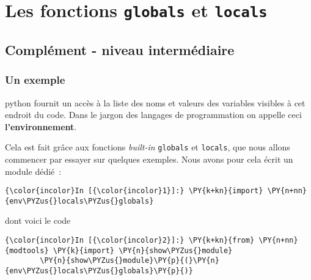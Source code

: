     
    
    
    

    

    \hypertarget{les-fonctions-globals-et-locals}{%
\section{\texorpdfstring{Les fonctions \texttt{globals} et
\texttt{locals}}{Les fonctions globals et locals}}\label{les-fonctions-globals-et-locals}}

    \hypertarget{compluxe9ment---niveau-intermuxe9diaire}{%
\subsection{Complément - niveau
intermédiaire}\label{compluxe9ment---niveau-intermuxe9diaire}}

    \hypertarget{un-exemple}{%
\subsubsection{Un exemple}\label{un-exemple}}

    python fournit un accès à la liste des noms et valeurs des variables
visibles à cet endroit du code. Dans le jargon des langages de
programmation on appelle ceci \textbf{l'environnement}.

Cela est fait grâce aux fonctions \emph{built-in} \texttt{globals} et
\texttt{locals}, que nous allons commencer par essayer sur quelques
exemples. Nous avons pour cela écrit un module dédié~:

    \begin{Verbatim}[commandchars=\\\{\},frame=single,framerule=0.3mm,rulecolor=\color{cellframecolor}]
{\color{incolor}In [{\color{incolor}1}]:} \PY{k+kn}{import} \PY{n+nn}{env\PYZus{}locals\PYZus{}globals}
\end{Verbatim}


    dont voici le code

    \begin{Verbatim}[commandchars=\\\{\},frame=single,framerule=0.3mm,rulecolor=\color{cellframecolor}]
{\color{incolor}In [{\color{incolor}2}]:} \PY{k+kn}{from} \PY{n+nn}{modtools} \PY{k}{import} \PY{n}{show\PYZus{}module}
        \PY{n}{show\PYZus{}module}\PY{p}{(}\PY{n}{env\PYZus{}locals\PYZus{}globals}\PY{p}{)}
\end{Verbatim}


